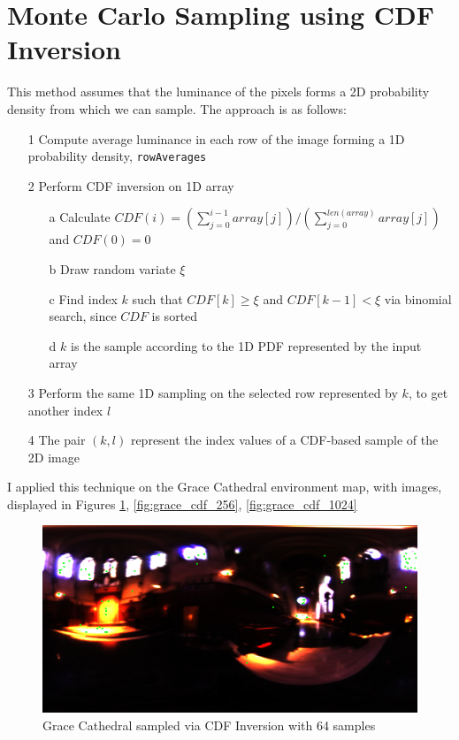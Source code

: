 \documentclass[a4paper,12pt,oneside,final]{report}
\newenvironment{changemargin}[2]{\begin{list}{}{%
\setlength{\topsep}{0pt}%
\setlength{\leftmargin}{0pt}%
\setlength{\rightmargin}{0pt}%
\setlength{\listparindent}{\parindent}%
\setlength{\itemindent}{\parindent}%
\setlength{\parsep}{0pt plus 1pt}%
\addtolength{\leftmargin}{#1}%
\addtolength{\rightmargin}{#2}%
}\item }{\end{list}}
\begin{document}
\section{Monte Carlo Sampling using CDF Inversion}
This method assumes that the luminance of the pixels forms a 2D probability density from which we can sample.  The approach is as follows:
\begin{itemize}
  \item[1] Compute average luminance in each row of the image forming a 1D probability density, \verb+rowAverages+
  \item[2] Perform CDF inversion on 1D array
  \begin{itemize}
    \item[a] Calculate $CDF(i) = ( \sum_{j=0}^{i-1} array[j] ) / (\sum_{j=0}^{len(array)} array[j])$ and $CDF(0) = 0$
    \item[b] Draw random variate $\xi$
    \item[c] Find index $k$ such that $CDF[k] \geq \xi$ and $CDF[k-1] < \xi$ via binomial search, since $CDF$ is sorted
    \item[d] $k$ is the sample according to the 1D PDF represented by the input array
  \end{itemize}
  \item[3] Perform the same 1D sampling on the selected row represented by $k$, to get another index $l$
  \item[4] The pair $(k, l)$ represent the index values of a CDF-based sample of the 2D image
\end{itemize}

I applied this technique on the Grace Cathedral environment map, with images, displayed in Figures \ref{fig:grace_cdf_64}, \ref{fig:grace_cdf_256}, \ref{fig:grace_cdf_1024}

\begin{figure}[!h]
  \begin{changemargin}{-50mm}{-50mm}
    \center
    \includegraphics[scale=0.4]{grace_cdf_64.png}
    \caption{Grace Cathedral sampled via CDF Inversion with 64 samples \label{fig:grace_cdf_64}}
  \end{changemargin}
\end{figure}
\end{document}
